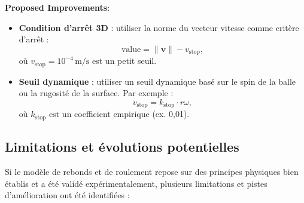 \documentclass[10pt,a4paper]{report}
\begin{document}
\textbf{Proposed Improvements}:
\begin{itemize}
    \item \textbf{Condition d'arrêt 3D} : utiliser la norme du vecteur vitesse comme critère d'arrêt :
    \[
    \text{value} = \|\mathbf{v}\| - v_{\text{stop}},
    \]
    où $v_{\text{stop}} = 10^{-4} \, \text{m/s}$ est un petit seuil.
    \item \textbf{Seuil dynamique} : utiliser un seuil dynamique basé sur le spin de la balle ou la rugosité de la surface. Par exemple :
    \[
    v_{\text{stop}} = k_{\text{stop}} \cdot r \omega,
    \]
    où $k_{\text{stop}}$ est un coefficient empirique (ex. 0,01).
\end{itemize}


\subsection{Limitations et évolutions potentielles}
\label{subsec:limitations_bouncing_rolling}

Si le modèle de rebonds et de roulement repose sur des principes physiques bien établis et a été validé expérimentalement, plusieurs limitations et pistes d'amélioration ont été identifiées :
\end{document}
